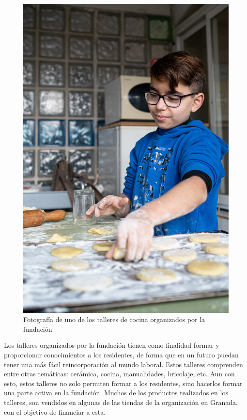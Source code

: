 \begin{figure}
    \centering
    \includegraphics[width=0.9\linewidth]{imagenes/fes/taller2.jpg}
    \caption{Fotografía de uno de los talleres de cocina organizados por la fundación}
\end{figure}

Los talleres organizados por la fundación tienen como finalidad formar y proporcionar conocimientos a los residentes, de forma que en un futuro puedan tener una más fácil reincorporación al mundo laboral. Estos talleres comprenden entre otras temáticas: cerámica, cocina, manualidades, bricolaje, etc. Aun con esto, estos talleres no solo permiten formar a los residentes, sino hacerlos formar una parte activa en la fundación. Muchos de los productos realizados en los talleres, son vendidos en algunas de las tiendas de la organización en Granada, con el objetivo de financiar a esta.